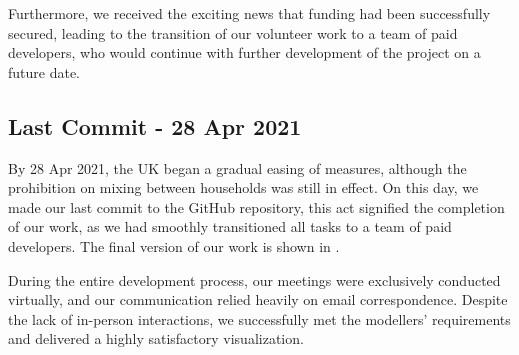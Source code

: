 Furthermore, we received the exciting news that funding had been successfully secured, leading to the transition of our volunteer work to a team of paid developers, who would continue with further development of the project on a future date.

\subsection{Last Commit - 28 Apr 2021}
By 28 Apr 2021, the UK began a gradual easing of measures, although the prohibition on mixing between households was still in effect.
On this day, we made our last commit to the GitHub repository, this act signified the completion of our work, as we had smoothly transitioned all tasks to a team of paid developers.
The final version of our work is shown in .

During the entire development process, our meetings were exclusively conducted virtually, and our communication relied heavily on email correspondence.
Despite the lack of in-person interactions, we successfully met the modellers' requirements and delivered a highly satisfactory visualization.
